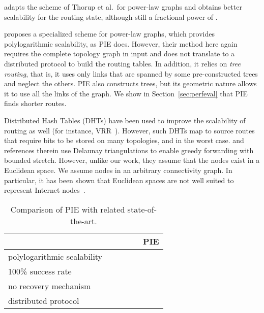 \documentclass[conference]{IEEEtran}
\begin{document}
\cite{Chen:compact} adapts the scheme of Thorup et al.\ for power-law graphs and obtains better scalability for the routing state, although still a fractional power of .

\cite{brady} proposes a specialized scheme for power-law graphs, which provides polylogarithmic scalability, as PIE does. However, their method here again requires the complete topology graph in input and does not translate to a distributed protocol to build the routing tables.
In addition, it relies on \emph{tree routing}, that is, it uses only links that are spanned by some pre-constructed trees and neglect the others. PIE also constructs trees, but its geometric nature allows it to use all the links of the graph. We show in Section~\ref{sec:perfeval} that PIE finds shorter routes.









Distributed Hash Tables (DHTs) have been used to improve the scalability of routing as well (for instance, VRR~\cite{caesar:VRR}). However, such DHTs map to source routes that require  bits to be stored on many topologies, and  in the worst case. \cite{ghaffari:delaunay} and references therein use Delaunay triangulations to enable greedy forwarding with bounded stretch. However, unlike our work, they assume that the nodes exist in a Euclidean space. We assume nodes in an arbitrary connectivity graph. In particular, it has been shown that Euclidean spaces are not well suited to represent Internet nodes~\cite{lee:euclidean}.

\begin{table}[htb]
    \centering
        \begin{tabular}{|l|c|c|c|c|c|}
        \hline
        & \cite{brady} & \cite{thorup:compact,mao:S4,singla2010} & \cite{Krioukov:sustaining} & \cite{Pei:greedy} & PIE\\
        \hline
	polylogarithmic scalability & \checkmark &  & \checkmark & \checkmark & \checkmark\\
	100\% success rate & \checkmark & \checkmark &  & \checkmark & \checkmark\\
	no recovery mechanism & \checkmark & \checkmark & \checkmark &  & \checkmark\\
	distributed protocol &  & \checkmark & \checkmark & \checkmark & \checkmark\\
	\hline
        \end{tabular}
	\caption{Comparison of PIE with related state-of-the-art.}
	\label{table:soa}
\end{table}
\vspace {-2em}
\end{document}
